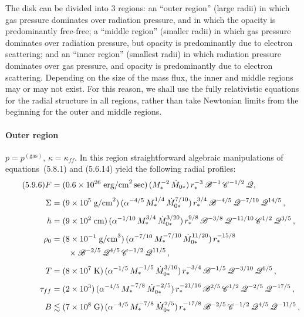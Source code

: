 The disk can be divided into 3 regions: an ``outer region'' (large radii) in
which gas pressure dominates over radiation pressure, and in which the opacity
is predominantly free-free; a ``middle region'' (smaller radii) in which gas
pressure dominates over radiation pressure, but opacity is predominantly due
to electron scattering; and an ``inner region'' (smallest radii) in which radiation
pressure dominates over gas pressure, and opacity is predominantly due to
electron scattering.  Depending on the size of the mass flux, the inner and middle
regions may or may not exist.  For this reason, we shall use the fully relativistic
equations for the radial structure in all regions, rather than take Newtonian
limits from the beginning for the outer and middle regions.


\paragraph{Outer region}

$p = p^{(\text{gas})}$, $\kappa = \kappa_{ff}$.  In this region straightforward algebraic manipulations of
equations~(5.8.1) and (5.6.14) yield the following radial profiles:
%
\begin{align}
\tag{5.9.6}
F &= (0.6 \times 10^{26}\;\text{erg/cm}^2\,\text{sec})\,
    (M_*^{-2}\,\dot{M}_{0*})\,
    r_*^{-3}\,\mathscr{B}^{-1}\,\mathscr{C}^{-1/2}\,\mathscr{Q}, \notag \\[4pt]
%
\Sigma &= (9 \times 10^{5}\;\text{g/cm}^2)\,
    (\alpha^{-4/5}\,M_*^{1/4}\,\dot{M}_{0*}^{7/10})\,
    r_*^{3/4}\,
    \mathscr{B}^{-4/5}\,\mathscr{Q}^{-7/10}\,\mathscr{Q}^{14/5}\,, \notag \\[4pt]
%
h &= (9 \times 10^{2}\;\text{cm})\,
    (\alpha^{-1/10}\,M_*^{3/4}\,\dot{M}_{0*}^{3/20})\,
    r_*^{9/8}\,
    \mathscr{B}^{-3/8}\,\mathscr{Q}^{-11/10}\,\mathscr{C}^{1/2}\,
    \mathscr{Q}^{3/5}\,, \notag \\[4pt]
%
\rho_0 &= (8 \times 10^{-1}\;\text{g/cm}^3)\,
    (\alpha^{-7/10}\,M_*^{-7/10}\,\dot{M}_{0*}^{11/20})\,
    r_*^{-15/8}\notag \\
  &\qquad \times \mathscr{B}^{-2/5}\,\mathscr{Q}^{4/5}\,
    \mathscr{C}^{-1/2}\,\mathscr{Q}^{11/5}\,, \notag \\[4pt]
%
T &= (8 \times 10^{7}\;\text{K})\,
    (\alpha^{-1/5}\,M_*^{-1/5}\,\dot{M}_{0*}^{3/10})\,
    r_*^{-3/4}\,
    \mathscr{B}^{-1/5}\,\mathscr{Q}^{-3/10}\,\mathscr{Q}^{6/5}\,, \notag \\[4pt]
%
\tau_{ff} &= (2 \times 10^{3})\,
    (\alpha^{-4/5}\,M_*^{-7/8}\,\dot{M}_{0*}^{-2/5})\,
    r_*^{-21/16}\,
    \mathscr{B}^{2/5}\,\mathscr{C}^{1/2}\,\mathscr{Q}^{-2/5}\,\mathscr{Q}^{-17/5}\,, \notag \\[4pt]
%
B &\lesssim (7 \times 10^{8}\;\text{G})\,
    (\alpha^{-4/5}\,M_*^{-7/8}\,\dot{M}_{0*}^{2/5})\,
    r_*^{-17/8}\,
    \mathscr{B}^{-2/5}\,\mathscr{C}^{-1/2}\,\mathscr{Q}^{4/5}\,\mathscr{Q}^{-11/5}\,,
\end{align}

